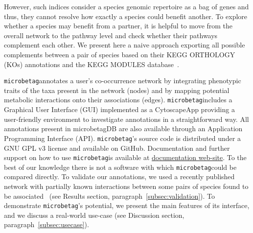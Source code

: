 \documentclass[sn-mathphys,Numbered]{sn-jnl}  %
\theoremstyle{thmstyleone}%
\theoremstyle{thmstyletwo}%
\theoremstyle{thmstylethree}%
\newcommand{\microbetag}{\texttt{microbetag}}
\begin{document}
    However, such indices consider a species genomic repertoire as a bag of genes and thus, they cannot resolve how exactly a species could benefit another.
    To explore whether a species may benefit from a partner, it is helpful to move from the overall network to the pathway level and check whether their pathways complement each other.
    We present here a naive approach exporting all possible complements between a pair of species based on their KEGG ORTHOLOGY (KOs) annotations and the KEGG MODULES database~\cite{keggmodulesdb}.

    \microbetag annotates a user's co-occurrence network by integrating phenotypic traits of the taxa present in the network (nodes) and by mapping potential metabolic interactions onto their associations (edges).
    \microbetag includes a Graphical User Interface (GUI) implemented as a CytoscapeApp providing a user-friendly environment to investigate annotations in a straightforward way.
    All annotations present in microbetagDB are also available through an Application Programming Interface (API).
    \microbetag's source code is distributed under a GNU GPL v3 license and available on GitHub. 
    Documentation and further support on how to use \microbetag is available at \href{https://hariszaf.github.io/microbetag/}{documentation web-site}.
    To the best of our knowledge there is not a software with which \microbetag could be compared directly. 
    To validate our annotations, we used a recently published network with partially known interactions between some pairs of species found to be associated~\cite{hessler2023vitamin} (see Results section, paragraph~\ref{subsec:validation}).
    To demonstrate \microbetag's potential, we present the main features of its interface, and we discuss a real-world use-case (see Discussion section, paragraph~\ref{subsec:usecase}).



\end{document}
